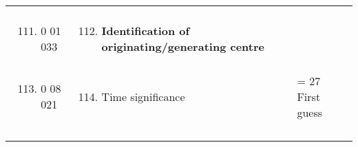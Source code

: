 \begin{longtable}[]{@{}llll@{}}
\begin{minipage}[t]{0.22\columnwidth}
\end{minipage} & \begin{minipage}[t]{0.22\columnwidth}\raggedright
\strut
\end{minipage}\tabularnewline
\begin{minipage}[t]{0.22\columnwidth}\raggedright
\strut
\end{minipage} & \begin{minipage}[t]{0.22\columnwidth}\raggedright
\begin{enumerate}
\setcounter{enumi}{110}
\item
  0 01 033
\end{enumerate}\strut
\end{minipage} & \begin{minipage}[t]{0.22\columnwidth}\raggedright
\begin{enumerate}
\setcounter{enumi}{111}
\item
  \textbf{Identification of originating/generating centre}
\end{enumerate}\strut
\end{minipage} & \begin{minipage}[t]{0.22\columnwidth}\raggedright
\strut
\end{minipage}\tabularnewline
\begin{minipage}[t]{0.22\columnwidth}\raggedright
\strut
\end{minipage} & \begin{minipage}[t]{0.22\columnwidth}\raggedright
\begin{enumerate}
\setcounter{enumi}{112}
\item
  0 08 021
\end{enumerate}\strut
\end{minipage} & \begin{minipage}[t]{0.22\columnwidth}\raggedright
\begin{enumerate}
\setcounter{enumi}{113}
\item
  Time significance
\end{enumerate}\strut
\end{minipage} & \begin{minipage}[t]{0.22\columnwidth}\raggedright
= 27 First guess\strut
\end{minipage}\tabularnewline
\begin{minipage}[t]{0.22\columnwidth}\raggedright
\strut
\end{minipage} & \begin{minipage}[t]{0.22\columnwidth}\raggedright
\begin{enumerate}

\end{enumerate}
\end{minipage}
\end{longtable}
